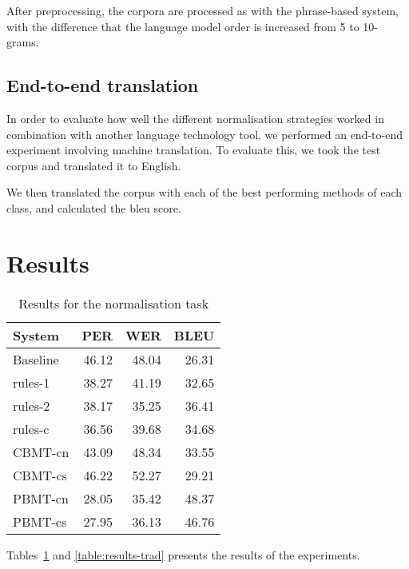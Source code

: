 \documentclass[11pt]{article}
\begin{document}
After preprocessing, the corpora are processed as with the phrase-based system, with the difference that the language model order is increased from 5 to 10-grams.

\subsection{End-to-end translation}

In order to evaluate how well the different normalisation strategies worked in 
combination with another language technology tool, we performed an end-to-end experiment
involving machine translation.
To evaluate this, we took the test corpus and translated it to English. 

We then translated the corpus with each of the best performing methods of each class, and 
calculated the {\sc bleu} score.

\section{Results}

\begin{table}
  \centering
  \begin{tabular}{|l|r|r|r|}
     \hline
    \textbf{System} & \textbf{PER} & \textbf{WER} & \textbf{BLEU} \\
     \hline
     Baseline & 46.12 & 48.04 & 26.31 \\
     \hline
     rules-1 & 38.27 & 41.19 & 32.65 \\
     rules-2 & 38.17 & 35.25 & 36.41 \\
     rules-c & 36.56 & 39.68 & 34.68 \\
     \hline
     CBMT-cn & 43.09 & 48.34 & 33.55 \\
     CBMT-cs & 46.22 & 52.27 & 29.21 \\
     PBMT-cn & 28.05 & 35.42 & 48.37 \\
     PBMT-cs & 27.95 & 36.13 & 46.76 \\
     \hline
  \end{tabular}
  \caption{Results for the normalisation task}
  \label{table:results-norm}
\end{table}

Tables~\ref{table:results-norm} and \ref{table:results-trad} presents the results of the experiments.
\end{document}

